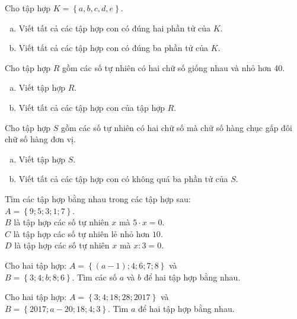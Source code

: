 \begin{bt}
\begin{enumerate}[a)]
\end{enumerate}
\end{bt}   \begin{bt}
Cho tập hợp $K = \left\{a, b, c, d, e\right\}$.
\begin{enumerate}[a)]
\item Viết tất cả các tập hợp con có đúng hai phần tử của $K$.
\item Viết tất cả các tập hợp con có đúng ba phần tử của $K$.
\end{enumerate}
\end{bt}   \begin{bt}
Cho tập hợp $R$ gồm các số tự nhiên có hai chữ số giống nhau và nhỏ hơn 40.
\begin{enumerate}[a)]
\item Viết tập hợp $R$.
\item Viết tất cả các tập hợp con của tập hợp $R$.
\end{enumerate}
\end{bt}   \begin{bt}
Cho tập hợp $S$ gồm các số tự nhiên có hai chữ số mà chữ số hàng chục gấp đôi chữ số hàng đơn vị.
\begin{enumerate}[a)]
\item Viết tập hợp $S$.
\item Viết tất cả các tập hợp con có không quá ba phần tử của $S$.
\end{enumerate}
\end{bt}   \begin{bt}
Tìm các tập hợp bằng nhau trong các tập hợp sau:\\
$A = \left\{9; 5; 3; 1; 7\right\}$.\\
$B$ là  tập hợp các số tự nhiên $x$ mà $5\cdot x =0$.\\
$C$ là tập hợp các số tự nhiên lẻ nhỏ hơn $10$.\\
$D$ là tập hợp các số tự nhiên $x$ mà $x:3 =0$.
\end{bt}   \begin{bt}
Cho hai tập hợp: $A =\left\{(a - 1); 4; 6; 7; 8\right\}$ và \\$B = \left\{3; 4; b; 8; 6\right\}$. Tìm các số $a$ và $b$ để hai tập hợp bằng nhau. 
\end{bt}   \begin{bt}
Cho hai tập hợp: $A = \left\{3; 4; 18; 28; 2017\right\}$ và \\
$B= \left\{2017; a - 20; 18; 4; 3\right\}$. Tìm $a$ để hai tập hợp bằng nhau.
\end{bt}   \begin{bt}

\end{bt}
